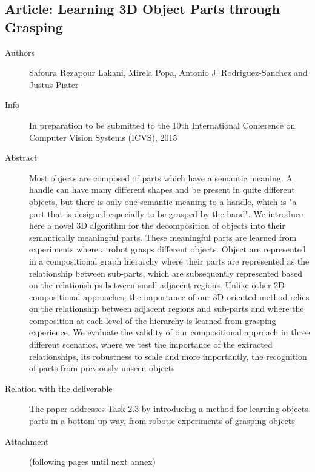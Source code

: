\documentclass[a4paper,11pt,pdf]{pacmanreport}
\begin{document}
\subsection{Article: Learning 3D Object Parts through Grasping} \label{ann:icvs}
\begin{description}
	\item[Authors] Safoura Rezapour Lakani, Mirela Popa, Antonio J. Rodriguez-Sanchez and Justus Piater
	\item[Info] In preparation to be submitted to the 10th International Conference on Computer Vision Systems (ICVS), 2015
	\item[Abstract] Most objects are composed of parts which have a semantic 
meaning. A handle can have many different shapes and be present in quite 
different objects, but there is only one semantic meaning to a handle, which is 
"a part that is designed especially to be grasped by the hand". We introduce 
here a novel 3D algorithm for the decomposition of objects into their 
semantically meaningful parts. These meaningful parts are learned from 
experiments where a robot grasps different objects. Object are represented in a 
compositional graph hierarchy where their parts are represented as the 
relationship between sub-parts, which are subsequently represented based on the 
relationships between small adjacent regions. Unlike other 2D compositional 
approaches, the importance of our 3D oriented method relies on the relationship 
between adjacent regions and sub-parts and where the composition at each level 
of the hierarchy is learned from grasping experience. We evaluate the validity 
of our compositional approach in three different scenarios, where we test the 
importance of the extracted relationships, its robustness to scale and more 
importantly, the recognition of parts from previously unseen objects
	\item[Relation with the deliverable] The paper addresses Task 2.3 by introducing a method for learning objects parts 
in a bottom-up way, from robotic experiments of grasping objects

    \item[Attachment] (following pages until next annex)
\end{description}

\end{document}
